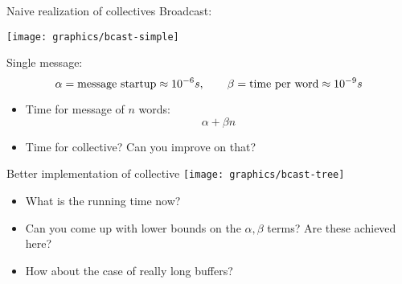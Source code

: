 
\begin{numberedframe}{Naive realization of collectives}
  Broadcast:
  
  \texttt{[image: graphics/bcast-simple]}

  Single message:
  \[ \alpha=\hbox{message startup}\approx 10^{-6}s,\qquad
  \beta=\hbox{time per word}\approx 10^{-9}s
  \]
  \begin{itemize}
  \item<2->Time for message of $n$ words: \[ \alpha +\beta n \]
  \item<3->Time for collective? Can you improve on that?
  \end{itemize}

\end{numberedframe}

\begin{numberedframe}{Better implementation of collective}
  \texttt{[image: graphics/bcast-tree]}
  
  \begin{itemize}
  \item<1->
    What is the running time now?
  \item<2->
    Can you come up with lower bounds on the $\alpha,\beta$ terms? Are
    these achieved here?
  \item<3-> How about the case of really long buffers?
  \end{itemize}

\end{numberedframe}

\endinput

\begin{numberedframe}{}
\begin{lstlisting}
  
\end{lstlisting}
\end{numberedframe}

\begin{numberedframe}{}
\begin{lstlisting}
  
\end{lstlisting}
\end{numberedframe}

\begin{numberedframe}{}
\begin{verbatim}
  
\end{verbatim}
\end{numberedframe}


